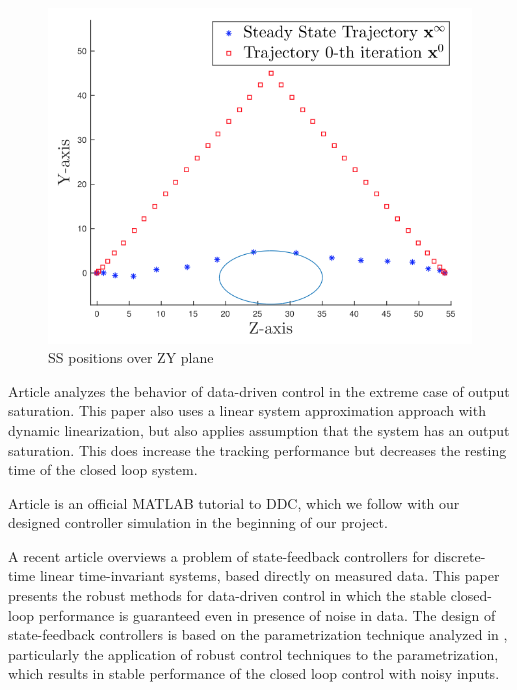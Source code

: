\documentclass[]{final_report}
\begin{document}
\begin{figure} [h!]
\centerline{\includegraphics[width=.75\textwidth]{Screenshots for related work/Asset p2/Asset p2p1.png}}
\caption{SS positions over ZY plane
\cite{rosolia2018a}}
\label{fig:p2p1}
\end{figure}


Article \cite{bu2018a} analyzes the behavior of data-driven control in the extreme case of output saturation. This paper also uses a linear system approximation approach with dynamic linearization, but also applies assumption that the system has an output saturation. This does increase the tracking performance but decreases the resting time of the closed loop system. 

Article \cite{pravallika2021a} is an official MATLAB tutorial to DDC, which we follow with our designed controller simulation in the beginning of our project.

A recent article \cite{Berberich_2020} overviews a problem of state-feedback controllers for discrete-time linear time-invariant systems, based directly on measured data. This paper presents the robust methods for data-driven control in which the stable closed-loop performance is guaranteed even in presence of noise in data. The design of state-feedback controllers is based on the parametrization technique analyzed in \cite{de2019a}, particularly the application of robust control techniques to the parametrization, which results in stable performance of the closed loop control with noisy inputs.
\end{document}
